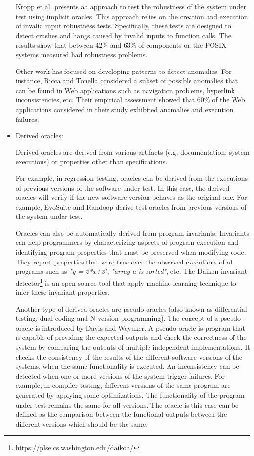 \begin{itemize}
	Kropp et al.\cite{kropp1998automated} presents an approach to test the robustness of the system under test using implicit oracles.
	This approach relies on the creation and execution of invalid input robustness tests. Specifically, these tests are designed to detect crashes and hangs caused by invalid inputs to function calls. The results show that between 42\% and 63\% of components on the POSIX systems measured had robustness problems. 
	
	Other work has focused on developing patterns to detect anomalies. For instance, Ricca and Tonella\cite{ricca2006detecting} considered a subset of possible anomalies that can be found in Web applications such as navigation problems, hyperlink inconsistencies, etc. Their empirical assessment
	showed that 60\% of the Web applications considered in their study exhibited anomalies and execution failures.
	
	
	\item Derived oracles:
	
	Derived oracles are derived from various artifacts (e.g. documentation, system executions) or properties other than specifications.
	
	For example, in regression testing, oracles can be derived from the executions of previous versions of the software under test. In this case, the derived oracles will verify if the new software version behaves as the original one\cite{mariani2007compatibility}. For example, EvoSuite and Randoop derive test oracles from previous versions of the system under test.
	
	Oracles can also be automatically derived from program invariants\cite{ernst2000quickly}. Invariants can help programmers by characterizing aspects of program execution and identifying program properties that must be preserved when modifying code. They report properties that were true over the observed executions of all programs such as \textit{"y = 2*x+3"}, \textit{"array a is sorted"}, etc. The Daikon invariant detector\footnote{https://plse.cs.washington.edu/daikon/} is an open source tool that apply machine learning technique to infer these invariant properties.
	
	Another type of derived oracles are pseudo-oracles (also known as differential testing, dual coding and N-version programming\cite{patrick2016testing}). 
	The concept of a pseudo-oracle is introduced by Davis and Weyuker\cite{davis1981pseudo}.
	A pseudo-oracle is program that is capable of providing the expected outputs and check the correctness of the system by comparing the outputs of multiple independent implementations. 
	It checks the consistency of the results of the different software versions of the systems, when the same functionality is executed. An inconsistency can be detected when one or more versions of the system trigger failures. 
	For example, in compiler testing, different versions of the same program are generated by applying some optimizations. The functionality of the program under test remains the same for all versions. The oracle is this case can be defined as the comparison between the functional outputs between the different versions which should be the same\cite{yang2011finding}.
	

\end{itemize}

